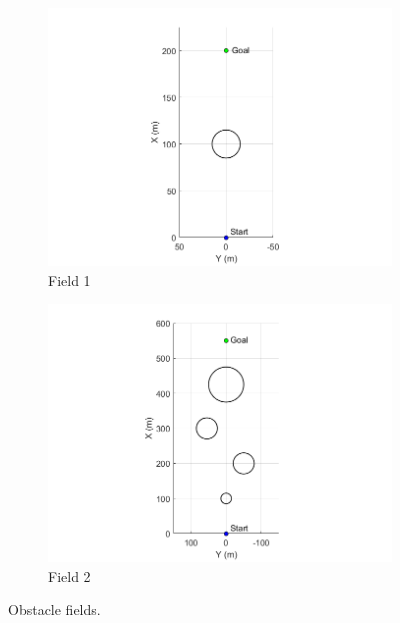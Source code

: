 \documentclass[12pt,onecolumn]{article}
\begin{document}
\begin{figure}
	\centering
	\begin{subfigure}[b]{0.49\columnwidth}
		\centering
		\includegraphics[width=\textwidth]{Figs/ObstacleField1.png}
		\caption{{\small Field 1}}   
		\label{fig:Obst1}
	\end{subfigure}
	\hfill
	\begin{subfigure}[b]{0.49\columnwidth}
		\centering
		\includegraphics[width=\columnwidth]{Figs/ObstacleField2.png}
		\caption{\small Field 2}   
		\label{fig:Obst2}
	\end{subfigure}
	\caption{\small Obstacle fields.}
	\label{fig:Obst}
\end{figure}
\end{document}
